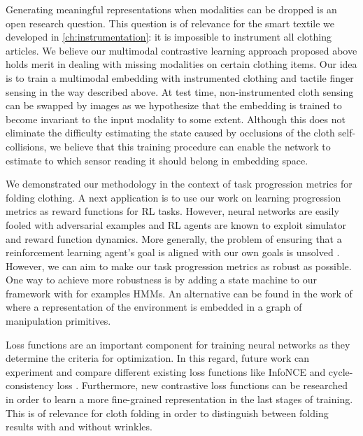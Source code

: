 \documentclass[\home/main.tex]{subfiles}
\begin{document}
Generating meaningful representations when modalities can be dropped is an open research question. This question is of relevance for the smart textile we developed in \cref{ch:instrumentation}: it is impossible to instrument all clothing articles. We believe our multimodal contrastive learning approach proposed above holds merit in dealing with missing modalities on certain clothing items. Our idea is to train a multimodal embedding with instrumented clothing and tactile finger sensing in the way described above. At test time, non-instrumented cloth sensing can be swapped by images as we hypothesize that the embedding is trained to become invariant to the input modality to some extent. Although this does not eliminate the difficulty estimating the state caused by occlusions of the cloth self-collisions, we believe that this training procedure can enable the network to estimate to which sensor reading it should belong in embedding space.

We demonstrated our methodology in the context of task progression metrics for folding clothing. A next application is to use our work on learning progression metrics as reward functions for RL tasks. However, neural networks are easily fooled with adversarial examples \autocite{nguyen2015deep} and RL agents are known to exploit simulator and reward function dynamics. More generally, the problem of ensuring that a reinforcement learning agent's goal is aligned with our own goals is unsolved \autocite{Sutton2018}. However, we can aim to make our task progression metrics as robust as possible. One way to achieve more robustness is by adding a state machine to our framework with for examples \glspl{HMM}. An alternative can be found in the work of \textcite{borràs2020encoding} where a representation of the environment is embedded in a graph of manipulation primitives.

Loss functions are an important component for training neural networks as they determine the criteria for optimization. In this regard, future work can experiment and compare different existing loss functions like InfoNCE \autocite{oord2018representation} and cycle-consistency loss \autocite{Dwibedi2019cycle}. 
Furthermore, new contrastive loss functions can be researched in order to learn a more fine-grained representation in the last stages of training. This is of relevance for cloth folding in order to distinguish between folding results with and without wrinkles.
\end{document}
